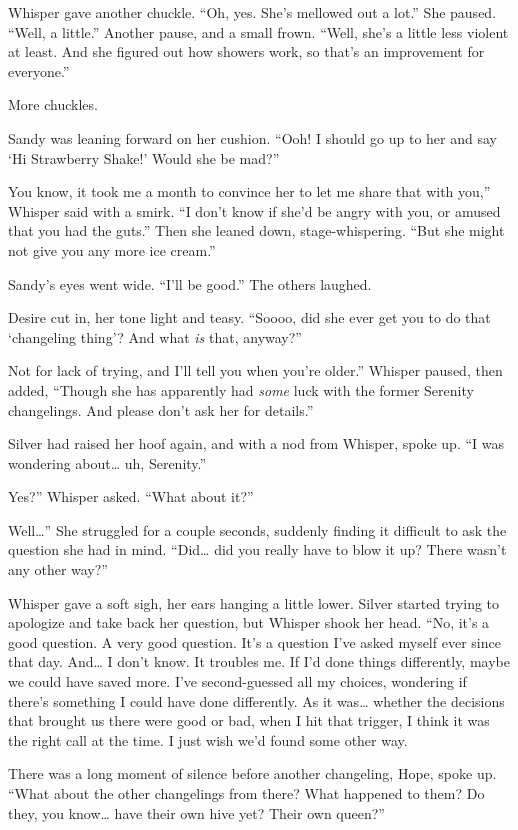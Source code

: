 Whisper gave another chuckle. “Oh, yes. She’s mellowed out a lot.” She paused. “Well, a little.” Another pause, and a small frown. “Well, she’s a little less violent at least. And she figured out how showers work, so that’s an improvement for everyone.”

More chuckles.

Sandy was leaning forward on her cushion. “Ooh! I should go up to her and say ‘Hi Strawberry Shake!’ Would she be mad?”

\leavevmode{}You know, it took me a month to convince her to let me share that with you,” Whisper said with a smirk. “I don’t know if she’d be angry with you, or amused that you had the guts.” Then she leaned down, stage-whispering. “But she might not give you any more ice cream.”

Sandy’s eyes went wide. “I’ll be good.” The others laughed.

Desire cut in, her tone light and teasy. “Soooo, did she ever get you to do that ‘changeling thing’? And what \textit{is} that, anyway?”

\leavevmode{}Not for lack of trying, and I’ll tell you when you’re older.” Whisper paused, then added, “Though she has apparently had \textit{some} luck with the former Serenity changelings. And please don’t ask her for details.”

Silver had raised her hoof again, and with a nod from Whisper, spoke up. “I was wondering about… uh, Serenity.”

\leavevmode{}Yes?” Whisper asked. “What about it?”

\leavevmode{}Well…” She struggled for a couple seconds, suddenly finding it difficult to ask the question she had in mind. “Did… did you really have to blow it up? There wasn’t any other way?”

Whisper gave a soft sigh, her ears hanging a little lower. Silver started trying to apologize and take back her question, but Whisper shook her head. “No, it’s a good question. A very good question. It’s a question I’ve asked myself ever since that day. And… I don’t know. It troubles me. If I’d done things differently, maybe we could have saved more. I’ve second-guessed all my choices, wondering if there’s something I could have done differently. As it was… whether the decisions that brought us there were good or bad, when I hit that trigger, I think it was the right call at the time. I just wish we’d found some other way.

There was a long moment of silence before another changeling, Hope, spoke up. “What about the other changelings from there? What happened to them? Do they, you know… have their own hive yet? Their own queen?”

